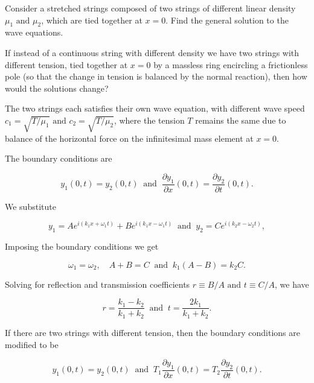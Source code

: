\documentclass[a4paper,12pt]{report}
\begin{document}
{Consider a stretched strings composed of two strings  of different linear density \(\mu _1 \text { and } \mu _2  \), which are tied together at \(x=0\). Find the general solution to the wave equations.

If instead of a continuous string with different density we have two strings with different tension, tied together at \(x=0\) by a massless ring encircling a frictionless pole (so that the change in tension is balanced by the normal reaction), then how would the solutions change? }
{The two strings each satisfies their own wave equation, with different wave speed \(c_1 = \sqrt{T/\mu _1 } \text { and } c_2 = \sqrt{T/\mu _2 }\), where the tension \(T\) remains the same due to balance of the horizontal force on the infinitesimal mass element at \(x=0\).

The boundary conditions are 

\begin{equation}
	y_1(0,t) = y_2(0,t) ~\text { and }~ \frac{\partial y_1 }{\partial x}(0,t) = \frac{\partial y_2 }{\partial t}(0,t).    
\end{equation}

We substitute 

\begin{equation}
	y_1  = A e^{i (k_1 x+\omega_1  t)} + B e^{i (k_1 x-\omega _1 t)} ~\text { and }~ y_2 = C e^{i (k_2 x-\omega _2 t)},
\end{equation}

Imposing the boundary conditions we get 

\begin{equation}
	\omega _1 = \omega _2, \quad A+B=C ~\text { and }~ k_1(A-B) = k_2C.
\end{equation}

Solving for reflection and transmission coefficients \(r \equiv B /A \text { and } t \equiv C /A\), we have 

\begin{equation}
	r = \frac{k_1 - k_2 }{k_1 + k_2 } ~\text { and }~ t = \frac{2 k_1 }{k_1 + k_2 }.  
\end{equation}


If there are two strings with different tension, then the boundary conditions are modified to be 

\begin{equation}
	y_1(0,t) = y_2(0,t) ~\text { and }~ T_1 \frac{\partial y_1 }{\partial x}(0,t) = T_2 \frac{\partial y_2 }{\partial t}(0,t).    
\end{equation}

}
\end{document}
